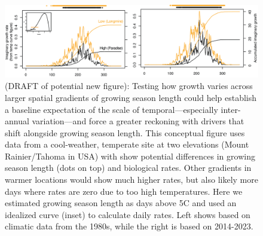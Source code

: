 \documentclass[11pt]{article}
\begin{document}
\clearpage
\begin{figure}[h!]
\includegraphics[width=1\textwidth]{..//figures/elevationconcept/elevationrates.png}
\caption{(DRAFT of potential new figure): Testing how growth varies across larger spatial gradients of growing season length could help establish a baseline expectation of the scale of temporal---especially inter-annual variation---and force a greater reckoning with drivers that shift alongside growing season length. This conceptual figure uses data from a cool-weather, temperate site at two elevations (Mount Rainier/Tahoma in USA) with show potential differences in growing season length (dots on top) and biological rates. Other gradients in warmer locations would show much higher rates, but also likely more days where rates are zero due to too high temperatures. Here we estimated growing season length as days above 5\degree C and used an idealized curve (inset) to calculate daily rates. Left shows based on climatic data from the 1980s, while the right is based on 2014-2023.  }
\label{fig:moraconcept}
\end{figure}
\end{document}
